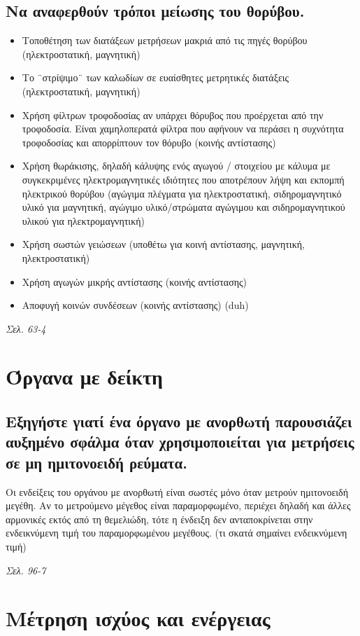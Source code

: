 \documentclass{article}
\begin{document}
\subsection{Να αναφερθούν τρόποι μείωσης του θορύβου.}
\begin{itemize}
    \item Τοποθέτηση των διατάξεων μετρήσεων μακριά από τις πηγές θορύβου (ηλεκτροστατική, μαγνητική)
    \item Το ¨στρίψιμο¨ των καλωδίων σε ευαίσθητες μετρητικές διατάξεις (ηλεκτροστατική, μαγνητική)
    \item Χρήση φίλτρων τροφοδοσίας αν υπάρχει θόρυβος που προέρχεται από την τροφοδοσία. Είναι χαμηλοπερατά φίλτρα που αφήνουν να περάσει η συχνότητα τροφοδοσίας και απορρίπτουν τον θόρυβο (κοινής αντίστασης)
    \item Χρήση θωράκισης, δηλαδή κάλυψης ενός αγωγού / στοιχείου με κάλυμα με συγκεκριμένες ηλεκτρομαγνητικές ιδιότητες που αποτρέπουν λήψη και εκπομπή ηλεκτρικού θορύβου (αγώγιμα πλέγματα για ηλεκτροστατική, σιδηρομαγνητικό υλικό για μαγνητική, αγώγιμο υλικό/στρώματα αγώγιμου και σιδηρομαγνητικού υλικού για ηλεκτρομαγνητική)
    \item Χρήση σωστών γειώσεων (υποθέτω για κοινή αντίστασης, μαγνητική, ηλεκτροστατική)
    \item Χρήση αγωγών μικρής αντίστασης (κοινής αντίστασης)
    \item Αποφυγή κοινών συνδέσεων (κοινής αντίστασης) \foreignlanguage{english}{(duh)}
\end{itemize}
\emph{Σελ. 63-4}

\section{Όργανα με δείκτη}
\subsection{Εξηγήστε γιατί ένα όργανο με ανορθωτή παρουσιάζει αυξημένο σφάλμα όταν χρησιμοποιείται για μετρήσεις σε μη ημιτονοειδή ρεύματα.}
Οι ενδείξεις του οργάνου με ανορθωτή είναι σωστές μόνο όταν μετρούν ημιτονοειδή μεγέθη. Αν το μετρούμενο μέγεθος είναι παραμορφωμένο, περιέχει δηλαδή και άλλες αρμονικές
εκτός από τη θεμελιώδη, τότε η ένδειξη δεν ανταποκρίνεται στην ενδεικνύμενη τιμή του παραμορφωμένου μεγέθους. (τι σκατά σημαίνει ενδεικνύμενη τιμή)

\emph{Σελ. 96-7}

\section{Μέτρηση ισχύος και ενέργειας}
\end{document}
